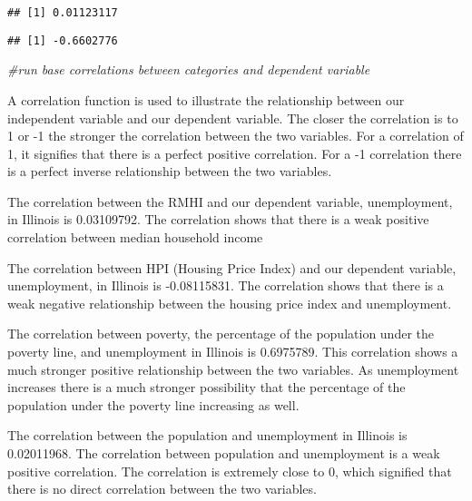 \documentclass[
]{article}
\newenvironment{Shaded}{\begin{snugshade}}{\end{snugshade}}
\newcommand{\CommentTok}[1]{\textcolor[rgb]{0.56,0.35,0.01}{\textit{#1}}}
\newcommand{\KeywordTok}[1]{\textcolor[rgb]{0.13,0.29,0.53}{\textbf{#1}}}
\newcommand{\NormalTok}[1]{#1}
\newcommand{\OperatorTok}[1]{\textcolor[rgb]{0.81,0.36,0.00}{\textbf{#1}}}
\begin{document}
\begin{verbatim}
## [1] 0.01123117
\end{verbatim}

\begin{Shaded}
\end{Shaded}

\begin{verbatim}
## [1] -0.6602776
\end{verbatim}

\begin{Shaded}
\begin{Highlighting}[]
\CommentTok{#run base correlations between categories and dependent variable}
\end{Highlighting}
\end{Shaded}

A correlation function is used to illustrate the relationship between
our independent variable and our dependent variable. The closer the
correlation is to 1 or -1 the stronger the correlation between the two
variables. For a correlation of 1, it signifies that there is a perfect
positive correlation. For a -1 correlation there is a perfect inverse
relationship between the two variables.

The correlation between the RMHI and our dependent variable,
unemployment, in Illinois is 0.03109792. The correlation shows that
there is a weak positive correlation between median household income

The correlation between HPI (Housing Price Index) and our dependent
variable, unemployment, in Illinois is -0.08115831. The correlation
shows that there is a weak negative relationship between the housing
price index and unemployment.

The correlation between poverty, the percentage of the population under
the poverty line, and unemployment in Illinois is 0.6975789. This
correlation shows a much stronger positive relationship between the two
variables. As unemployment increases there is a much stronger
possibility that the percentage of the population under the poverty line
increasing as well.

The correlation between the population and unemployment in Illinois is
0.02011968. The correlation between population and unemployment is a
weak positive correlation. The correlation is extremely close to 0,
which signified that there is no direct correlation between the two
variables.
\end{document}
